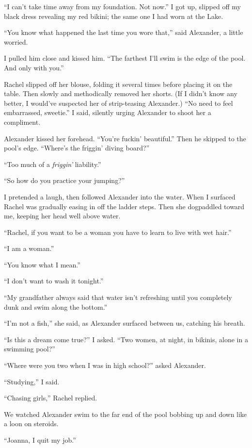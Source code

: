 ``I can't take time away from my foundation. Not now.'' I got up,
slipped off my black dress revealing my red bikini; the same one I had
worn at the Lake.

``You know what happened the last time you wore that,'' said Alexander,
a little worried.

I pulled him close and kissed him. ``The farthest I'll swim is the edge
of the pool. And only with you.''

Rachel slipped off her blouse, folding it several times before placing
it on the table. Then slowly and methodically removed her shorts. (If I
didn't know any better, I would've suspected her of strip-teasing
Alexander.) ``No need to feel embarrassed, sweetie.'' I said, silently
urging Alexander to shoot her a compliment.

Alexander kissed her forehead. ``You're fuckin' beautiful.'' Then he
skipped to the pool's edge. ``Where's the friggin' diving board?''

``Too much of a \emph{friggin'} liability.''

``So how do you practice your jumping?''

I pretended a laugh, then followed Alexander into the water. When I
surfaced Rachel was gradually easing in off the ladder steps. Then she
dogpaddled toward me, keeping her head well above water.

``Rachel, if you want to be a woman you have to learn to live with wet
hair.''

``I am a woman.''

``You know what I mean.''

``I don't want to wash it tonight.''

``My grandfather always said that water isn't refreshing until you
completely dunk and swim along the bottom.''

``I'm not a fish,'' she said, as Alexander surfaced between us, catching
his breath.

``Is this a dream come true?'' I asked. ``Two women, at night, in
bikinis, alone in a swimming pool?''

``Where were you two when I was in high school?'' asked Alexander.

``Studying,'' I said.

``Chasing girls,'' Rachel replied.

We watched Alexander swim to the far end of the pool bobbing up and down
like a loon on steroids.

``Joanna, I quit my job.''

